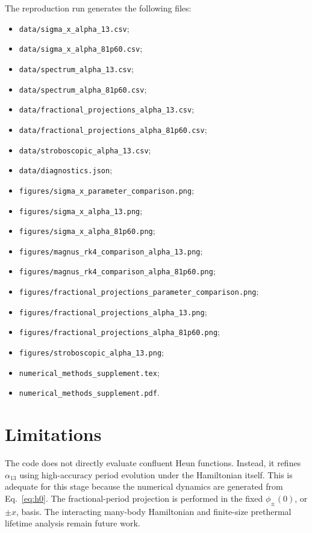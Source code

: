 \documentclass[11pt,a4paper]{article}
\begin{document}
The reproduction run generates the following files:
\begin{itemize}
  \item \texttt{data/sigma\_x\_alpha\_13.csv};
  \item \texttt{data/sigma\_x\_alpha\_81p60.csv};
  \item \texttt{data/spectrum\_alpha\_13.csv};
  \item \texttt{data/spectrum\_alpha\_81p60.csv};
  \item \texttt{data/fractional\_projections\_alpha\_13.csv};
  \item \texttt{data/fractional\_projections\_alpha\_81p60.csv};
  \item \texttt{data/stroboscopic\_alpha\_13.csv};
  \item \texttt{data/diagnostics.json};
  \item \texttt{figures/sigma\_x\_parameter\_comparison.png};
  \item \texttt{figures/sigma\_x\_alpha\_13.png};
  \item \texttt{figures/sigma\_x\_alpha\_81p60.png};
  \item \texttt{figures/magnus\_rk4\_comparison\_alpha\_13.png};
  \item \texttt{figures/magnus\_rk4\_comparison\_alpha\_81p60.png};
  \item \texttt{figures/fractional\_projections\_parameter\_comparison.png};
  \item \texttt{figures/fractional\_projections\_alpha\_13.png};
  \item \texttt{figures/fractional\_projections\_alpha\_81p60.png};
  \item \texttt{figures/stroboscopic\_alpha\_13.png};
  \item \texttt{numerical\_methods\_supplement.tex};
  \item \texttt{numerical\_methods\_supplement.pdf}.
\end{itemize}

\section{Limitations}

The code does not directly evaluate confluent Heun functions. Instead, it refines \(\alpha_{13}\) using high-accuracy period evolution under the Hamiltonian itself. This is adequate for this stage because the numerical dynamics are generated from Eq.~\eqref{eq:h0}. The fractional-period projection is performed in the fixed \(\phi_\pm(0)\), or \(\pm x\), basis. The interacting many-body Hamiltonian and finite-size prethermal lifetime analysis remain future work.
\end{document}
